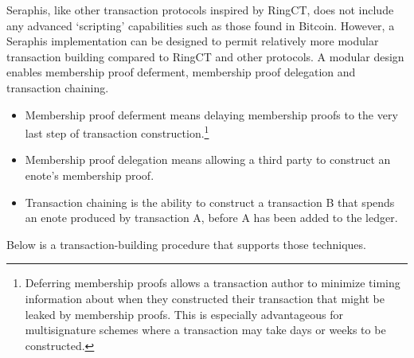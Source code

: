 Seraphis, like other transaction protocols inspired by RingCT, does not include any advanced `scripting' capabilities such as those found in Bitcoin. However, a Seraphis implementation can be designed to permit relatively more modular transaction building compared to RingCT and other protocols. A modular design enables membership proof deferment, membership proof delegation and transaction chaining.

\begin{itemize}
    \item Membership proof deferment means delaying membership proofs to the very last step of transaction construction.\footnote{Deferring membership proofs allows a transaction author to minimize timing information about when they constructed their transaction that might be leaked by membership proofs. This is especially advantageous for multisignature schemes where a transaction may take days or weeks to be constructed.}

    \item Membership proof delegation means allowing a third party to construct an enote's membership proof.

    \item Transaction chaining is the ability to construct a transaction B that spends an enote produced by transaction A, before A has been added to the ledger.
\end{itemize}

Below is a transaction-building procedure that supports those techniques.

